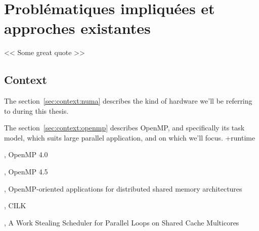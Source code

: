 \part{Problématiques impliquées et approches existantes}

\begin{savequote}[6cm]
<< Some great quote  >>
\end{savequote}
\chapter{Context}
\chaptertoc

The section~\ref{sec:context:numa} describes the kind of hardware we'll be referring to during this thesis.

The section~\ref{sec:context:openmp} describes OpenMP, and specifically its task model, which suits large parallel application, and on which we'll focus.
+runtime







\cite{openmp40}, OpenMP 4.0

\cite{openmp45}, OpenMP 4.5

\cite{Marowka2004}, OpenMP-oriented applications for distributed shared memory architectures

\cite{cilk5}, CILK

\cite{Tchiboukdjian2010}, A Work Stealing Scheduler for Parallel Loops on Shared Cache Multicores

